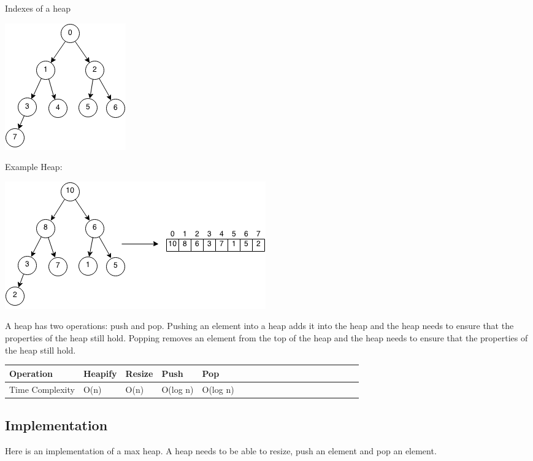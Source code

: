 \documentclass[11pt,oneside]{book}
\makeatletter
\def\maxwidth#1{\ifdim\Gin@nat@width>#1 #1\else\Gin@nat@width\fi}
\makeatother
\begin{document}
Indexes of a heap

\includegraphics[width=\maxwidth{\textwidth}]{maxheap2.png}

Example Heap:

\includegraphics[width=\maxwidth{\textwidth}]{maxheap.png}

A heap has two operations: push and pop. Pushing an element into a heap adds it into the heap and the heap needs to ensure that the properties of the heap still hold. Popping removes an element from the top of the heap and the heap needs to ensure that the properties of the heap still hold.

\vspace{10pt} \begin{tabular}{|l|l|l|l|l|l|l|l|l|l|l|l|l|l|l|l|l|l|l}\hline


  Operation &
  Heapify &
  Resize &
  Push &
  Pop\\
\hline


  Time Complexity &
  O(n) &
  O(n) &
  O(log n) &
  O(log n)\\

\hline\end{tabular}

\subsection{Implementation}

Here is an implementation of a max heap. A heap needs to be able to resize, push an element and pop an element.
\end{document}
